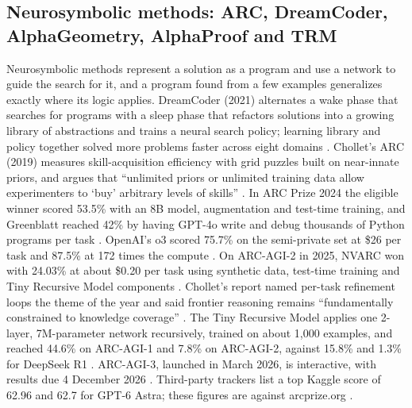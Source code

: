 \subsection{Neurosymbolic methods: ARC, DreamCoder, AlphaGeometry, AlphaProof and TRM}
Neurosymbolic methods represent a solution as a program and use a network to guide the search for it, and a program found from a few examples generalizes exactly where its logic applies. DreamCoder (2021) alternates a wake phase that searches for programs with a sleep phase that refactors solutions into a growing library of abstractions and trains a neural search policy; learning library and policy together solved more problems faster across eight domains \cite{post49}. Chollet's ARC (2019) measures skill-acquisition efficiency with grid puzzles built on near-innate priors, and argues that ``unlimited priors or unlimited training data allow experimenters to `buy' arbitrary levels of skills'' \cite{post50}. In ARC Prize 2024 the eligible winner scored 53.5\% with an 8B model, augmentation and test-time training, and Greenblatt reached 42\% by having GPT-4o write and debug thousands of Python programs per task \cite{post51}. OpenAI's o3 scored 75.7\% on the semi-private set at \$26 per task and 87.5\% at 172 times the compute \cite{post52}. On ARC-AGI-2 in 2025, NVARC won with 24.03\% at about \$0.20 per task using synthetic data, test-time training and Tiny Recursive Model components \cite{post53}. Chollet's report named per-task refinement loops the theme of the year and said frontier reasoning remains ``fundamentally constrained to knowledge coverage'' \cite{post54}. The Tiny Recursive Model applies one 2-layer, 7M-parameter network recursively, trained on about 1,000 examples, and reached 44.6\% on ARC-AGI-1 and 7.8\% on ARC-AGI-2, against 15.8\% and 1.3\% for DeepSeek R1 \cite{post55}. ARC-AGI-3, launched in March 2026, is interactive, with results due 4 December 2026 \cite{post56,post57}. Third-party trackers list a top Kaggle score of 62.96 and 62.7 for GPT-6 Astra; these figures are \unverified{} against arcprize.org \cite{post58,post59}.


